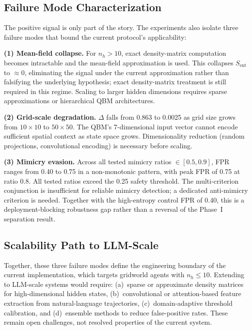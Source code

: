\documentclass[11pt]{article}
\begin{document}
	\newpage
	
	\subsection{Failure Mode Characterization}
	
	The positive signal is only part of the story. The experiments also isolate
	three failure modes that bound the current protocol's applicability:
	
	\textbf{(1) Mean-field collapse.} For $n_h > 10$, exact density-matrix
	computation becomes intractable and the mean-field approximation is used. This
	collapses $S_\mathrm{ent}$ to $\approx 0$, eliminating the signal under the
	current approximation rather than falsifying the underlying hypothesis; exact
	density-matrix treatment is still required in this regime. Scaling to larger
	hidden dimensions requires sparse approximations or hierarchical QBM
	architectures.
	
	\textbf{(2) Grid-scale degradation.} $\Delta$ falls from 0.863 to 0.0025 as grid
	size grows from $10 \times 10$ to $50 \times 50$. The QBM's 7-dimensional
	input vector cannot encode sufficient spatial context as state space grows.
	Dimensionality reduction (random projections, convolutional encoding) is
	necessary before scaling.
	
	\textbf{(3) Mimicry evasion.} Across all tested mimicry ratios $\in [0.5, 0.9]$,
	FPR ranges from 0.40 to 0.75 in a non-monotonic pattern, with peak FPR of 0.75
	at ratio 0.8. All tested ratios exceed the 0.25 safety threshold. The
	multi-criterion conjunction is insufficient for reliable mimicry detection; a
	dedicated anti-mimicry criterion is needed. Together with the high-entropy
	control FPR of 0.40, this is a deployment-blocking robustness gap rather than
	a reversal of the Phase~I separation result.
	
	\newpage
	
	\subsection{Scalability Path to LLM-Scale}\label{sec:scaling_path}
	
	Together, these three failure modes define the engineering boundary of the
	current implementation, which targets gridworld agents with $n_h \leq 10$.
	Extending to LLM-scale systems would require: (a)~sparse or approximate
	density matrices for high-dimensional hidden states, (b)~convolutional or
	attention-based feature extraction from natural-language trajectories,
	(c)~domain-adaptive threshold calibration, and (d)~ensemble methods to reduce
	false-positive rates. These remain open challenges, not resolved properties of
	the current system.
	
\end{document}

